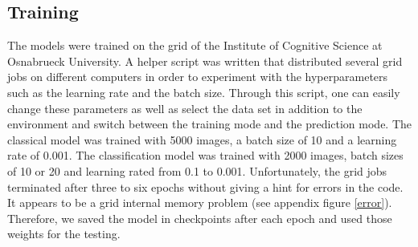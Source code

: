 \documentclass[12pt,letterpaper]{article}
\begin{document}
\subsection{Training}
The models were trained on the grid of the Institute of Cognitive Science at Osnabrueck University. A helper script was written that distributed several grid jobs on different computers in order to experiment with the hyperparameters such as the learning rate and the batch size. Through this script, one can easily change these parameters as well as select the data set in addition to the environment and switch between the training mode and the prediction mode. The classical model was trained with 5000 images, a batch size of 10 and a learning rate of 0.001. The classification model was trained with 2000 images, batch sizes of 10 or 20 and learning rated from 0.1 to 0.001. Unfortunately, the grid jobs terminated after three to six epochs without giving a hint for errors in the code. It appears to be a grid internal memory problem (see appendix figure \ref{error}). Therefore, we saved the model in checkpoints after each epoch and used those weights for the testing.
\end{document}
